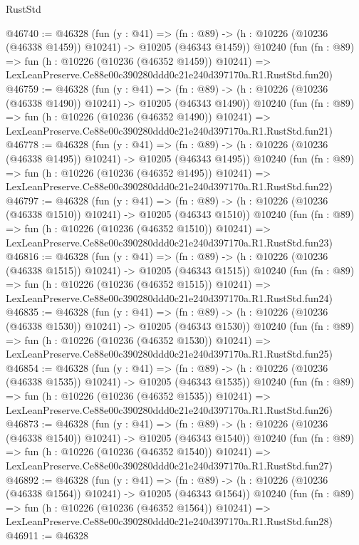 \begin{lexlean}{RustStd}
\begin{coremodule}
@46740 := @46328
    (fun (y : @41) =>
    (fn : @89) -> (h : @10226 (@10236 (@46338 @1459)) @10241) -> @10205 (@46343 @1459))
    @10240
    (fun (fn : @89) =>
    fun (h : @10226 (@10236 (@46352 @1459)) @10241) =>
    LexLeanPreserve.Ce88e00c390280ddd0c21e240d397170a.R1.RustStd.fun20)
@46759 := @46328
    (fun (y : @41) =>
    (fn : @89) -> (h : @10226 (@10236 (@46338 @1490)) @10241) -> @10205 (@46343 @1490))
    @10240
    (fun (fn : @89) =>
    fun (h : @10226 (@10236 (@46352 @1490)) @10241) =>
    LexLeanPreserve.Ce88e00c390280ddd0c21e240d397170a.R1.RustStd.fun21)
@46778 := @46328
    (fun (y : @41) =>
    (fn : @89) -> (h : @10226 (@10236 (@46338 @1495)) @10241) -> @10205 (@46343 @1495))
    @10240
    (fun (fn : @89) =>
    fun (h : @10226 (@10236 (@46352 @1495)) @10241) =>
    LexLeanPreserve.Ce88e00c390280ddd0c21e240d397170a.R1.RustStd.fun22)
@46797 := @46328
    (fun (y : @41) =>
    (fn : @89) -> (h : @10226 (@10236 (@46338 @1510)) @10241) -> @10205 (@46343 @1510))
    @10240
    (fun (fn : @89) =>
    fun (h : @10226 (@10236 (@46352 @1510)) @10241) =>
    LexLeanPreserve.Ce88e00c390280ddd0c21e240d397170a.R1.RustStd.fun23)
@46816 := @46328
    (fun (y : @41) =>
    (fn : @89) -> (h : @10226 (@10236 (@46338 @1515)) @10241) -> @10205 (@46343 @1515))
    @10240
    (fun (fn : @89) =>
    fun (h : @10226 (@10236 (@46352 @1515)) @10241) =>
    LexLeanPreserve.Ce88e00c390280ddd0c21e240d397170a.R1.RustStd.fun24)
@46835 := @46328
    (fun (y : @41) =>
    (fn : @89) -> (h : @10226 (@10236 (@46338 @1530)) @10241) -> @10205 (@46343 @1530))
    @10240
    (fun (fn : @89) =>
    fun (h : @10226 (@10236 (@46352 @1530)) @10241) =>
    LexLeanPreserve.Ce88e00c390280ddd0c21e240d397170a.R1.RustStd.fun25)
@46854 := @46328
    (fun (y : @41) =>
    (fn : @89) -> (h : @10226 (@10236 (@46338 @1535)) @10241) -> @10205 (@46343 @1535))
    @10240
    (fun (fn : @89) =>
    fun (h : @10226 (@10236 (@46352 @1535)) @10241) =>
    LexLeanPreserve.Ce88e00c390280ddd0c21e240d397170a.R1.RustStd.fun26)
@46873 := @46328
    (fun (y : @41) =>
    (fn : @89) -> (h : @10226 (@10236 (@46338 @1540)) @10241) -> @10205 (@46343 @1540))
    @10240
    (fun (fn : @89) =>
    fun (h : @10226 (@10236 (@46352 @1540)) @10241) =>
    LexLeanPreserve.Ce88e00c390280ddd0c21e240d397170a.R1.RustStd.fun27)
@46892 := @46328
    (fun (y : @41) =>
    (fn : @89) -> (h : @10226 (@10236 (@46338 @1564)) @10241) -> @10205 (@46343 @1564))
    @10240
    (fun (fn : @89) =>
    fun (h : @10226 (@10236 (@46352 @1564)) @10241) =>
    LexLeanPreserve.Ce88e00c390280ddd0c21e240d397170a.R1.RustStd.fun28)
@46911 := @46328

\end{coremodule}
\end{lexlean}
